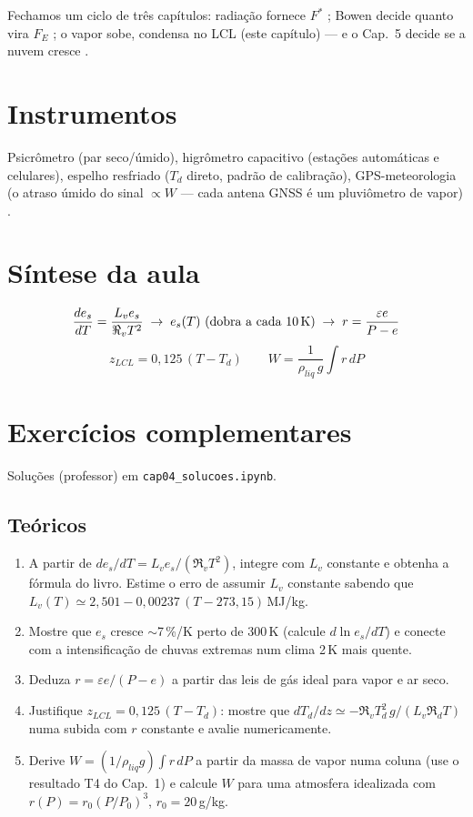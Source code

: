 \documentclass[11pt]{article}
\begin{document}
Fechamos um ciclo de três capítulos: radiação fornece $F^*$
; Bowen decide quanto vira $F_E$
; o vapor sobe, condensa no LCL (este
capítulo) — e o Cap.~5 decide se a nuvem cresce
.

\section{Instrumentos}

Psicrômetro (par seco/úmido), higrômetro capacitivo (estações automáticas
e celulares), espelho resfriado ($T_d$ direto, padrão de calibração),
GPS-meteorologia (o atraso úmido do sinal $\propto W$ — cada antena GNSS é
um pluviômetro de vapor) .

\section{Síntese da aula}

\begin{noquadro}
\[ \frac{de_s}{dT} = \frac{L_v e_s}{\Re_v T^2}
 \;\to\; e_s(T)\ \text{(dobra a cada 10\,K)}
 \;\to\; r = \frac{\varepsilon e}{P-e} \]
\[ z_{LCL} = 0{,}125\,(T-T_d) \qquad
   W = \frac{1}{\rho_{liq}\, g}\!\int\! r\,dP \]
\end{noquadro}

\section{Exercícios complementares}\label{sec:exercicios}

Soluções (professor) em \texttt{cap04\_solucoes.ipynb}.

\subsection*{Teóricos}

\begin{enumerate}[label=\textbf{T\arabic*.},itemsep=4pt]
  \item A partir de $de_s/dT = L_v e_s/(\Re_v T^2)$, integre com $L_v$
        constante e obtenha a fórmula do livro. Estime o erro de assumir
        $L_v$ constante sabendo que $L_v(T) \simeq 2{,}501 - 0{,}00237\,
        (T-273{,}15)$\,MJ/kg.
  \item Mostre que $e_s$ cresce $\sim$7\,\%/K perto de 300\,K
        (calcule $d\ln e_s/dT$) e conecte com a intensificação de chuvas
        extremas num clima 2\,K mais quente.
  \item Deduza $r = \varepsilon e/(P-e)$ a partir das leis de gás ideal
        para vapor e ar seco.
  \item Justifique $z_{LCL} = 0{,}125\,(T-T_d)$: mostre que
        $dT_d/dz \simeq -\Re_v T_d^2\,g/(L_v \Re_d T)$ numa subida com $r$
        constante e avalie numericamente.
  \item Derive $W = (1/\rho_{liq}g)\int r\,dP$ a partir da massa de vapor
        numa coluna (use o resultado T4 do Cap.~1) e calcule $W$ para uma
        atmosfera idealizada com $r(P) = r_0 (P/P_0)^3$, $r_0 = 20$\,g/kg.
\end{enumerate}
\end{document}
